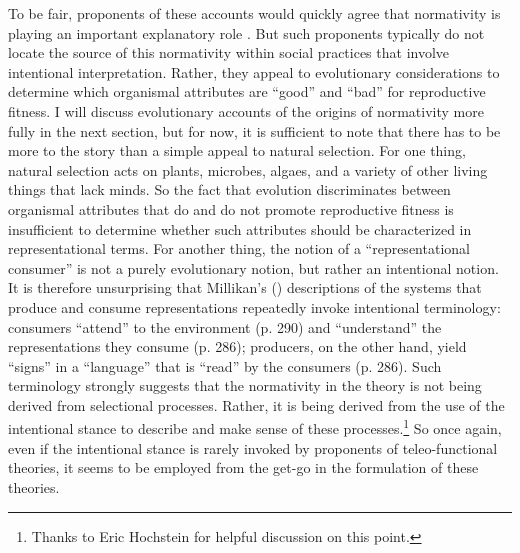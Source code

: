 To be fair, proponents of these accounts would quickly agree that normativity is playing an important explanatory role \citep[e.g.,][]{Millikan:1989,Dennett:1987}. But such proponents typically do not locate the source of this normativity within social practices that involve intentional interpretation. Rather, they appeal to evolutionary considerations to determine which organismal attributes are ``good'' and ``bad'' for reproductive fitness. I will discuss evolutionary accounts of the origins of normativity more fully in the next section, but for now, it is sufficient to note that there has to be more to the story than a simple appeal to natural selection. For one thing, natural selection acts on plants, microbes, algaes, and a variety of other living things that lack minds. So the fact that evolution discriminates between organismal attributes that do and do not promote reproductive fitness is insufficient to determine whether such attributes should be characterized in representational terms. For another thing, the notion of a ``representational consumer'' is not a purely evolutionary notion, but rather an intentional notion. It is therefore unsurprising that Millikan's (\citeyear{Millikan:1989}) descriptions of the systems that produce and consume representations repeatedly invoke intentional terminology: consumers ``attend'' to the environment (p. 290) and ``understand'' the representations they consume (p. 286); producers, on the other hand, yield ``signs'' in a ``language'' that is ``read'' by the consumers (p. 286). Such terminology strongly suggests that the normativity in the theory is not being derived from selectional processes. Rather, it is being derived from the use of the intentional stance to describe and make sense of these processes.\footnote{Thanks to Eric Hochstein for helpful discussion on this point.} So once again, even if the intentional stance is rarely invoked by proponents of teleo-functional theories, it seems to be employed from the get-go in the formulation of these theories.  

